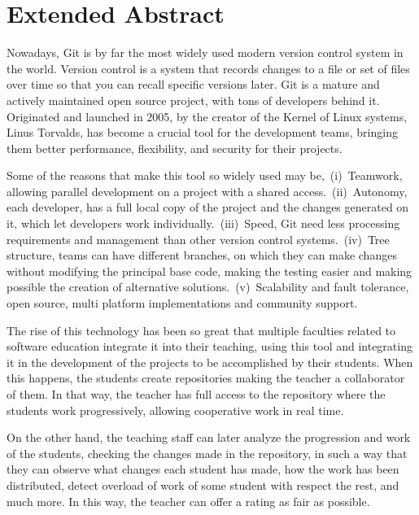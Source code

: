 \chapter*{Extended Abstract\label{00Abstractsummary}}


Nowadays, Git is by far the most widely used modern version control system
in the world. Version control is a system that records changes to a
file or set of files over time so that you can recall specific versions
later. Git is a mature and actively maintained open source project, with
tons of developers behind it. Originated and launched in 2005, by the
creator of the Kernel of Linux systems, Linus Torvalds, has become a
crucial tool for the development teams, bringing them better performance,
flexibility, and security for their projects.

Some of the reasons that make this tool so widely used may
be,~(i)~Teamwork, allowing parallel development on a project with a shared
access.~(ii)~Autonomy, each developer, has a full local copy of the project
and the changes generated on it, which let developers work
individually.~(iii)~Speed, Git need less processing requirements and
management than other version control systems.~(iv)~Tree structure, teams
can have different branches, on which they can make changes without
modifying the principal base code, making the testing easier and making
possible the creation of alternative solutions.~(v)~Scalability and fault
tolerance, open source, multi platform implementations and community
support.

The rise of this technology has been so great that multiple faculties
related to software education integrate it into their teaching, using this
tool and integrating it in the development of the projects to be
accomplished by their students. When this happens, the students create
repositories making the teacher a collaborator of them. In that way, the
teacher has full access to the repository where the students work
progressively, allowing cooperative work in real time.

On the other hand, the teaching staff can later analyze the progression and
work of the students, checking the changes made in the repository, in such
a way that they can observe what changes each student has made, how the
work has been distributed, detect overload of work of some student with
respect the rest, and much more. In this way, the teacher can offer a rating
as fair as possible.


